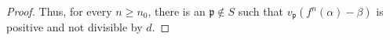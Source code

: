 \documentclass[10pt,a4paper]{amsart}
\newcommand{\fp}{\ensuremath{{\mathfrak{p}}}}
\begin{document}
\begin{proof}
 Thus, for every $n \geq n_0$, there is an $\fp \notin S$ such that
 $v_\fp(f^n(\alpha) - \beta)$ is positive and not divisible by $d$.  


  

  

      
    


\end{proof}
\end{document}
